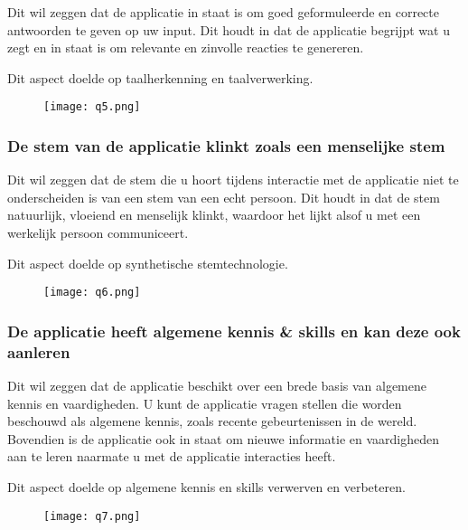 Dit wil zeggen  dat de applicatie in staat is om goed geformuleerde en correcte antwoorden te geven op uw input. Dit houdt in dat de applicatie begrijpt wat u zegt en in staat is om relevante en zinvolle reacties te genereren. 

Dit aspect doelde op taalherkenning en taalverwerking.

\begin{figure}[htbp]
    \centering
    \texttt{[image: q5.png]}
    \label{fig:vraag_5_resultaat}
\end{figure}

\subsubsection{De stem van de applicatie klinkt zoals een menselijke stem}

Dit wil zeggen dat de stem die u hoort tijdens interactie met de applicatie niet te onderscheiden is van een stem van een echt persoon. Dit houdt in dat de stem natuurlijk, vloeiend en menselijk klinkt, waardoor het lijkt alsof u met een werkelijk persoon communiceert.

Dit aspect doelde op synthetische stemtechnologie.

\begin{figure}[htbp]
    \centering
    \texttt{[image: q6.png]}
    \label{fig:vraag_6_resultaat}
\end{figure}

\subsubsection{De applicatie heeft algemene kennis \& skills en kan deze ook aanleren}

Dit wil zeggen dat de applicatie beschikt over een brede basis van algemene kennis en vaardigheden. U kunt de applicatie vragen stellen die worden beschouwd als algemene kennis, zoals recente gebeurtenissen in de wereld. Bovendien is de applicatie ook in staat om nieuwe informatie en vaardigheden aan te leren naarmate u met de applicatie interacties heeft.

Dit aspect doelde op algemene kennis en skills verwerven en verbeteren.

\begin{figure}[htbp]
    \centering
    \texttt{[image: q7.png]}
    \label{fig:vraag_7_resultaat}
\end{figure}


